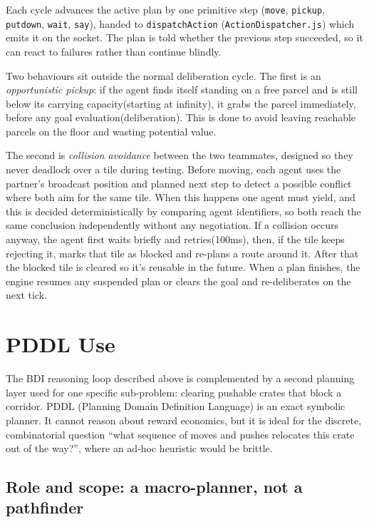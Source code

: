 \documentclass[a4paper,11pt]{article}
\begin{document}
Each cycle advances the active plan by one primitive step (\texttt{move},
\texttt{pickup}, \texttt{putdown}, \texttt{wait}, \texttt{say}), handed to
\texttt{dispatchAction} (\texttt{ActionDispatcher.js}) which emits it on the socket.
The plan is told whether the previous step succeeded, so it can react to failures
rather than continue blindly.

Two behaviours sit outside the normal deliberation cycle. The first is an
\emph{opportunistic pickup}: if the agent finds itself standing on a free parcel and
is still below its carrying capacity(starting at infinity), it grabs the parcel immediately, before any
goal evaluation(deliberation). This is done to avoid leaving reachable parcels on the floor and wasting potential value.

The second is \emph{collision avoidance} between the two teammates, designed so they
never deadlock over a tile during testing. Before moving, each agent uses the partner's broadcast
position and planned next step to detect a possible conflict where both aim for the same tile. 
When this happens one agent must yield, and this is decided deterministically by comparing agent identifiers, 
so both reach the same conclusion independently without any negotiation. 
If a collision occurs anyway, the agent first waits briefly and retries(100ms), then, if the tile keeps
rejecting it, marks that tile as blocked and re-plans a route around it. After that the blocked tile is cleared so it's reusable in the future. 
When a plan finishes, the engine resumes any suspended plan or clears the goal and
re-deliberates on the next tick.



\section{PDDL Use}
The BDI reasoning loop described above is complemented by a second planning layer
used for one specific sub-problem: clearing pushable crates that block a corridor.
PDDL (Planning Domain Definition Language) is an exact symbolic planner. It cannot
reason about reward economics, but it is ideal for the discrete, combinatorial
question ``what sequence of moves and pushes relocates this crate out of the way?'',
where an ad-hoc heuristic would be brittle.

\subsection{Role and scope: a macro-planner, not a pathfinder}
\end{document}

